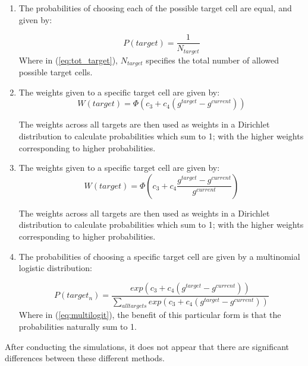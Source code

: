 \documentclass[pdftex,10pt,a4paper]{article}
\begin{document}
\begin{enumerate}
\item The probabilities of choosing each of the possible target cell are equal, and given by:

\begin{equation}\label{eq:tot_target}
P(target) = \frac{1}{N_{target}} 
\end{equation}
Where in (\ref{eq:tot_target}), $N_{target}$ specifies the total number of allowed possible target cells.

\item The weights given to a specific target cell are given by:
\begin{equation}
W(target) = \Phi (c_3 + c_4(g^{target} - g^{current}))
\end{equation}

The weights across all targets are then used as weights in a Dirichlet distribution to calculate probabilities which sum to 1; with the higher weights corresponding to higher probabilities.

\item The weights given to a specific target cell are given by:
\begin{equation}
W(target) = \Phi (c_3 + c_4\frac{g^{target} - g^{current}}{g^{current}})
\end{equation}

The weights across all targets are then used as weights in a Dirichlet distribution to calculate probabilities which sum to 1; with the higher weights corresponding to higher probabilities.

\item The probabilities of choosing a specific target cell are given by a multinomial logistic distribution:

\begin{equation} \label{eq:multilogit}
P(target_n) = \frac{exp(c_3 + c_4(g^{target} - g^{current}))}{\sum\limits_{all targets} exp(c_3 + c_4(g^{target} - g^{current}))}
\end{equation}
Where in (\ref{eq:multilogit}), the benefit of this particular form is that the probabilities naturally sum to 1.
\end{enumerate}

After conducting the simulations, it does not appear that there are significant differences between these different methods.
\end{document}
